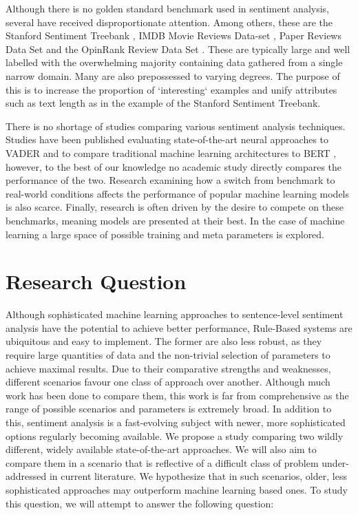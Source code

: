 \documentclass{csfourzero}
\begin{document}
Although there is no golden standard benchmark used in sentiment analysis, several have received disproportionate attention. Among others, these are the Stanford Sentiment Treebank \cite{SST}, IMDB Movie Reviews Data-set \cite{IMDB}, Paper Reviews Data Set and the OpinRank Review Data Set \cite{opinrank}. These are typically large and well labelled with the overwhelming majority containing data gathered from a single narrow domain. Many are also prepossessed to varying degrees. The purpose of this is to increase the proportion of `interesting` examples and unify attributes such as text length as in the example of the Stanford Sentiment Treebank.  

\par

There is no shortage of studies comparing various sentiment analysis techniques. Studies have been published evaluating state-of-the-art neural approaches to VADER \cite{lstmbertvader} and to compare traditional machine learning architectures to BERT \cite{mlcomp} \cite{bertml}, however, to the best of our knowledge no academic study directly compares the performance of the two. Research examining how a switch from benchmark to real-world conditions affects the performance of popular machine learning models is also scarce. Finally, research is often driven by the desire to compete on these benchmarks, meaning models are presented at their best. In the case of machine learning a large space of possible training and meta parameters is explored.

\section{Research Question}
\label{sec:rq}
Although sophisticated machine learning approaches to sentence-level sentiment analysis have the potential to achieve better performance, Rule-Based systems are ubiquitous and easy to implement. The former are also less robust, as they require large quantities of data and the non-trivial selection of parameters to achieve maximal results. Due to their comparative strengths and weaknesses, different scenarios favour one class of approach over another. Although much work has been done to compare them, this work is far from comprehensive as the range of possible scenarios and parameters is extremely broad. In addition to this, sentiment analysis is a fast-evolving subject with newer, more sophisticated options regularly becoming available. We propose a study comparing two wildly different, widely available state-of-the-art approaches. We will also aim to compare them in a scenario that is reflective of a difficult class of problem under-addressed in current literature. We hypothesize that in such scenarios, older, less sophisticated approaches may outperform machine learning based ones. To study this question, we will attempt to answer the following question:
\end{document}
